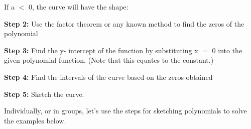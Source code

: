 If a $<$ 0, the curve will have the shape:
\begin{center}
\end{center}

\textbf{Step 2:} Use the factor theorem or any known method to find the zeros of the
polynomial

\textbf{Step 3:} Find the y- intercept of the function by substituting x $=$ 0 into the
given polynomial function. (Note that this equates to the constant.)

\textbf{Step 4:} Find the intervals of the curve based on the zeros obtained

\textbf{Step 5:} Sketch the curve.

Individually, or in groups, let's use the steps for sketching polynomials to solve
the examples below.

